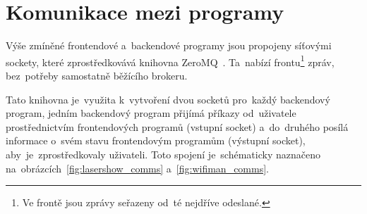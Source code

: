 \section{Komunikace mezi programy}\label{sec:comms}
Výše zmíněné frontendové a~backendové programy jsou propojeny síťovými sockety, které zprostředkovává knihovna ZeroMQ~\cite{zeromq}. Ta~nabízí frontu\footnote{Ve frontě jsou zprávy seřazeny od~té nejdříve odeslané.} zpráv, bez~potřeby samostatně běžícího brokeru.

Tato knihovna je~využita k~vytvoření dvou socketů pro~každý backendový program, jedním backendový program přijímá příkazy od~uživatele prostřednictvím frontendových programů (vstupní socket) a~do~druhého posílá informace o~svém stavu frontendovým programům (výstupní socket), aby~je~zprostředkovaly uživateli. Toto spojení je~schématicky naznačeno na~obrázcích~\ref{fig:lasershow_comms} a~\ref{fig:wifiman_comms}.

